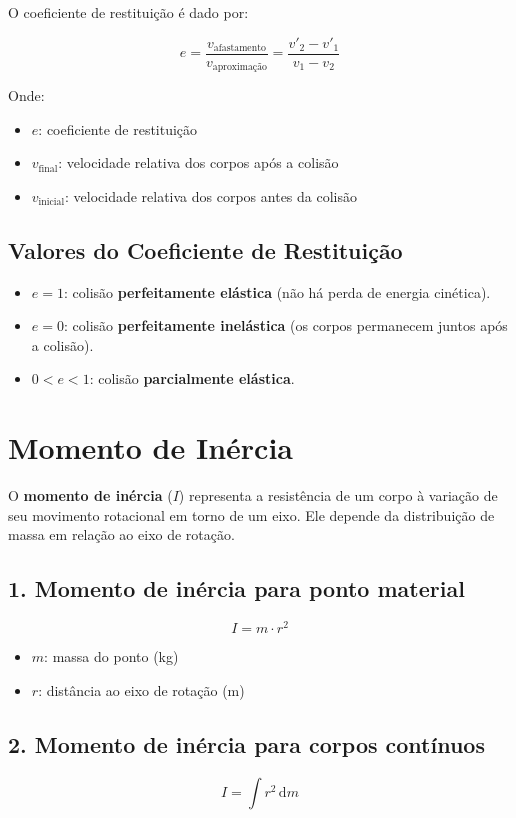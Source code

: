 \documentclass[a4paper,12pt]{article}
\begin{document}
\begin{multicols}{2}
O coeficiente de restituição é dado por:

\[
e = \frac{v_{\text{afastamento}}}{v_{\text{aproximação}}} = \frac{v'_{2} - v'_{1}}{v_{1} - v_{2}}
\]

Onde:
\begin{itemize}
  \item \( e \): coeficiente de restituição
  \item \( v_{\text{final}} \): velocidade relativa dos corpos após a colisão
  \item \( v_{\text{inicial}} \): velocidade relativa dos corpos antes da colisão
\end{itemize}

\subsection{Valores do Coeficiente de Restituição}

\begin{itemize}
  \item \( e = 1 \): colisão \textbf{perfeitamente elástica} (não há perda de energia cinética).
  \item \( e = 0 \): colisão \textbf{perfeitamente inelástica} (os corpos permanecem juntos após a colisão).
  \item \( 0 < e < 1 \): colisão \textbf{parcialmente elástica}.
\end{itemize}

\section{Momento de Inércia}

O \textbf{momento de inércia} ($I$) representa a resistência de um corpo à variação de seu movimento rotacional em torno de um eixo. Ele depende da distribuição de massa em relação ao eixo de rotação.

\subsection*{1. Momento de inércia para ponto material}
\[
I = m \cdot r^2
\]
\begin{itemize}
    \item $m$: massa do ponto (kg)
    \item $r$: distância ao eixo de rotação (m)
\end{itemize}

\subsection{2. Momento de inércia para corpos contínuos}
\[
I = \int r^2 \, \mathrm{d}m
\]


\end{multicols}
\end{document}
